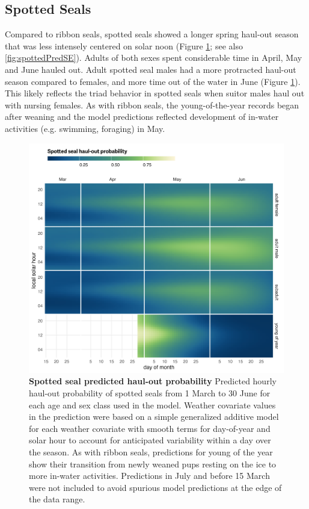 \documentclass[fleqn,10pt,lineno]{wlpeerj} %
\begin{document}
\subsection*{Spotted Seals}\label{spotted-seals}

Compared to ribbon seals, spotted seals showed a longer spring haul-out season
that was less intensely centered on solar noon (Figure \ref{fig:spottedHOCal};
see also \ref{fig:spottedPredSE}). Adults of both sexes spent considerable time
in April, May and June hauled out. Adult spotted seal males had a more
protracted haul-out season compared to females, and more time out of the water
in June (Figure \ref{fig:spottedHOCal}). This likely reflects the triad
behavior in spotted seals when suitor males haul out with nursing females. As
with ribbon seals, the young-of-the-year records began after weaning and the
model predictions reflected development of in-water activities (e.g.
swimming, foraging) in May.



\begin{figure}
\includegraphics[width=1\linewidth]{../figures/Figure-009} \caption{\textbf{Spotted seal predicted haul-out probability} \linebreak Predicted hourly haul-out probability of spotted seals from 1 March to 30 June for each age and sex class used in the model. Weather covariate values in the prediction were based on a simple generalized additive model for each weather covariate with smooth terms for day-of-year and solar hour to account for anticipated variability within a day over the season. As with ribbon seals, predictions for young of the year show their transition from newly weaned pups resting on the ice to more in-water activities. Predictions in July and before 15 March were not included to avoid spurious model predictions at the edge of the data range.}\label{fig:spottedHOCal}
\end{figure}
\end{document}
